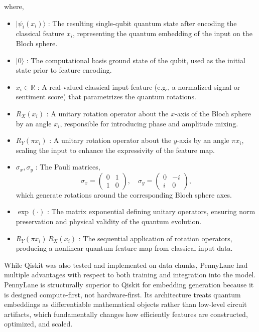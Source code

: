 \documentclass[pdflatex,sn-mathphys-num]{sn-jnl}%
\begin{document}
where,
\begin{itemize}
    \item $\lvert \psi_i(x_i) \rangle$ : The resulting single-qubit quantum state after encoding the classical feature $x_i$, representing the quantum embedding of the input on the Bloch sphere.

    \item $\lvert 0 \rangle$ : The computational basis ground state of the qubit, used as the initial state prior to feature encoding.

    \item $x_i \in \mathbb{R}$ : A real-valued classical input feature (e.g., a normalized signal or sentiment score) that parametrizes the quantum rotations.

    \item $R_X(x_i)$ : A unitary rotation operator about the $x$-axis of the Bloch sphere by an angle $x_i$, responsible for introducing phase and amplitude mixing.

    \item $R_Y(\pi x_i)$ : A unitary rotation operator about the $y$-axis by an angle $\pi x_i$, scaling the input to enhance the expressivity of the feature map.

    \item $\sigma_x, \sigma_y$ : The Pauli matrices,
    \[
    \sigma_x =
    \begin{pmatrix}
        0 & 1 \\
        1 & 0
    \end{pmatrix},
    \quad
    \sigma_y =
    \begin{pmatrix}
        0 & -i \\
        i & 0
    \end{pmatrix},
    \]
    which generate rotations around the corresponding Bloch sphere axes.

    \item $\exp(\cdot)$ : The matrix exponential defining unitary operators, ensuring norm preservation and physical validity of the quantum evolution.

    \item $R_Y(\pi x_i)\, R_X(x_i)$ : The sequential application of rotation operators, producing a nonlinear quantum feature map from classical input data.
\end{itemize}

While Qiskit was also tested and implemented on data chunks, PennyLane had multiple advantages with respect to both training and integration into the model.
PennyLane is structurally superior to Qiskit for embedding generation because it is designed compute-first, not hardware-first. Its architecture treats quantum embeddings as differentiable mathematical objects rather than low-level circuit artifacts, which fundamentally changes how efficiently features are constructed, optimized, and scaled.
\end{document}
